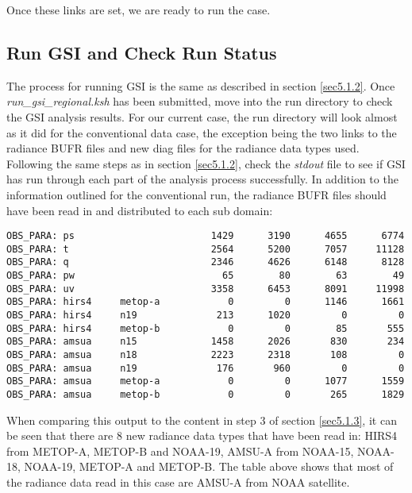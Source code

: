 \begin{itemize}
Once these links are set, we are ready to run the case. 


\end{itemize}

\subsection{Run GSI and Check Run Status}
\label{sec5.2.2}

The process for running GSI is the same as described in section \ref{sec5.1.2}.  Once \textit{run\_gsi\_regional.ksh} has been submitted, move into the run directory to check the GSI analysis results. For our current case, the run directory will look almost as it did for the conventional data case, the exception being the two links to the radiance BUFR files and new diag files for the radiance data types used. Following the same steps as in section \ref{sec5.1.2}, check the \textit{stdout} file to see if GSI has run through each part of the analysis process successfully.  In addition to the information outlined for the conventional run, the radiance BUFR files should have been read in and distributed to each sub domain: 

\begin{scriptsize}
\begin{verbatim}
OBS_PARA: ps                        1429      3190      4655      6774
OBS_PARA: t                         2564      5200      7057     11128
OBS_PARA: q                         2346      4626      6148      8128
OBS_PARA: pw                          65        80        63        49
OBS_PARA: uv                        3358      6453      8091     11998
OBS_PARA: hirs4     metop-a            0         0      1146      1661
OBS_PARA: hirs4     n19              213      1020         0         0
OBS_PARA: hirs4     metop-b            0         0        85       555
OBS_PARA: amsua     n15             1458      2026       830       234
OBS_PARA: amsua     n18             2223      2318       108         0
OBS_PARA: amsua     n19              176       960         0         0
OBS_PARA: amsua     metop-a            0         0      1077      1559
OBS_PARA: amsua     metop-b            0         0       265      1829
\end{verbatim}
\end{scriptsize}


When comparing this output to the content in step 3 of section \ref{sec5.1.3}, it can be seen that there are 8 new radiance data types that have been read in: HIRS4 from METOP-A, METOP-B and NOAA-19, AMSU-A from NOAA-15, NOAA-18, NOAA-19, METOP-A and METOP-B.  The table above shows that most of the radiance data read in this case are AMSU-A from NOAA satellite.

